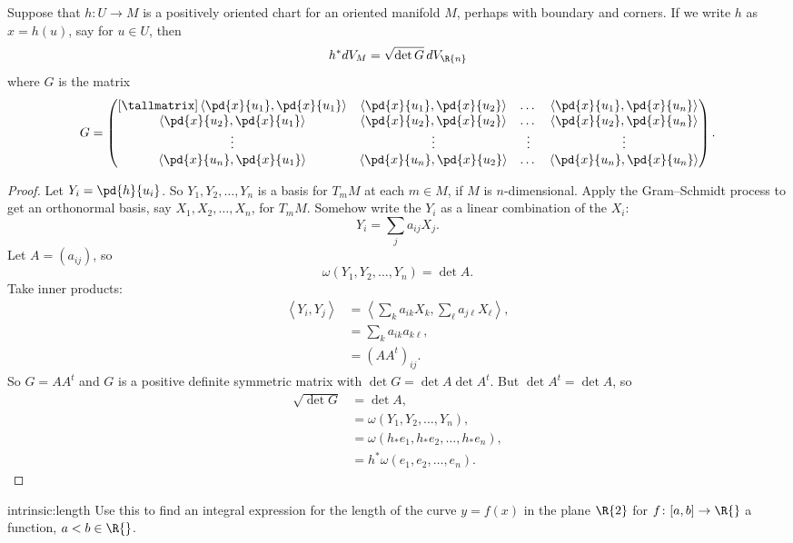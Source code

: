 \begin{lemma}
Suppose that \(h \colon U \to M\) is a positively oriented chart for an oriented manifold \(M\), perhaps with boundary and corners. 
If we write \(h\) as \(x=h(u)\), say for \(u \in U\), then
\[
h^* dV_M = 
\sqrt{\det G} \, dV_{\R{n}}
\]
where \(G\) is the matrix
\[
G = 
\begin{pmatrix}[\tallmatrix]
\left<\pd{x}{u_1},\pd{x}{u_1}\right> & 
\left<\pd{x}{u_1},\pd{x}{u_2}\right> & 
\dots &
\left<\pd{x}{u_1},\pd{x}{u_n}\right> \\
\left<\pd{x}{u_2},\pd{x}{u_1}\right> & 
\left<\pd{x}{u_2},\pd{x}{u_2}\right> & 
\dots &
\left<\pd{x}{u_2},\pd{x}{u_n}\right> \\
\vdots &
\vdots &
\vdots &
\vdots \\
\left<\pd{x}{u_n},\pd{x}{u_1}\right> & 
\left<\pd{x}{u_n},\pd{x}{u_2}\right> & 
\dots &
\left<\pd{x}{u_n},\pd{x}{u_n}\right>
\end{pmatrix}.
\]
\end{lemma}
\begin{proof}
Let \(Y_i = \pd{h}{u_i}\). 
So \(Y_1, Y_2, \dots, Y_n\) is a basis for \(T_m M\) at each \(m \in M\), if \(M\) is \(n\)-dimensional. 
Apply the Gram--Schmidt process to get an orthonormal basis, say \(X_1, X_2, \dots, X_n\),
for \(T_m M\). 
Somehow write the \(Y_i\) as a linear combination of the \(X_i\):
\[
Y_i = \sum_j a_{ij} X_j.
\]
Let \(A = \left(a_{ij}\right)\), so
\[
ω\left(Y_1,Y_2,\dots,Y_n\right)=\det A.
\]
Take inner products:
\begin{align*}
\left<Y_i,Y_j\right>
&=
\left<\sum_k a_{ik} X_k,  \sum_{\ell} a_{j\ell} X_{\ell}\right>,
\\
&=
\sum_k a_{ik} a_{k\ell},
\\
&=
\left(AA^t\right)_{ij}.
\end{align*}
So \(G = AA^t\) and \(G\) is a positive definite symmetric matrix with \(\det G = \det A \det A^t\). 
But \(\det A^t = \det A\), so 
\begin{align*}
\sqrt{\det G} &= \det A,
\\
&= ω\left(Y_1,Y_2,\dots,Y_n\right),
\\
&=
ω\left(h_* e_1, h_* e_2, \dots, h_* e_n\right),
\\
&=
h^* ω \left(e_1, e_2, \dots, e_n\right).
\end{align*}
\end{proof}

\begin{problem}{intrinsic:length}
Use this to find an integral expression for the length of the curve \(y=f(x)\) in the plane \(\R{2}\) for \(f \colon [a,b] \to \R{}\) a function, \(a < b \in \R{}\).
\end{problem}


